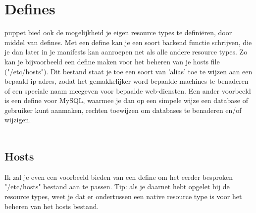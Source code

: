 \chapter{Defines}
puppet bied ook de mogelijkheid je eigen resource types te defini\"{e}ren, door middel van defines. Met een define kan je een soort backend functie schrijven, die je dan later in je manifests kan aanroepen net als alle andere resource types. Zo kan je bijvoorbeeld een define maken voor het beheren van je hosts file ("/etc/hosts"). Dit bestand staat je toe een soort van 'alias' toe te wijzen aan een bepaald ip-adres, zodat het gemakkelijker word bepaalde machines te benaderen of een speciale naam meegeven voor bepaalde web-diensten. Een ander voorbeeld is een define voor MySQL, waarmee je dan op een simpele wijze een database of gebruiker kunt aanmaken, rechten toewijzen om databases te benaderen en/of wijzigen.\\\\

\section{Hosts}
Ik zal je even een voorbeeld bieden van een define om het eerder besproken "/etc/hosts" bestand aan te passen. Tip: als je daarnet hebt opgelet bij de resource types, weet je dat er ondertussen een native resource type is voor het beheren van het hosts bestand.\\
